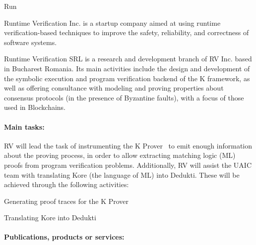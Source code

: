 \begin{sitedescription}{Run}



Runtime Verification Inc. is a startup company aimed at using runtime verification-based
techniques to improve the safety, reliability, and correctness of software systems.

Runtime Verification SRL is a research and development branch of RV Inc. based
in Bucharest Romania.  Its main activities include the design and development of
the symbolic execution and program verification backend of the K framework,
as well as offering consultance with modeling and proving properties about
consensus protocols (in the presence of Byzantine faults),
with a focus of those used in Blockchains.

\paragraph*{Main tasks:}


RV will lead the task of instrumenting the K Prover~ to emit enough information
about the proving process, in order to allow extracting matching logic (ML) proofs from
program verification problems.  Additionally, RV will assist the UAIC team with
translating Kore (the language of ML) into Dedukti.
These will be achieved through the following activities:


\begin{compactitem}
\item Generating proof traces for the K Prover
\item Translating Kore into Dedukti 
\end{compactitem}

\paragraph*{Publications, products or services:}



\end{sitedescription}

